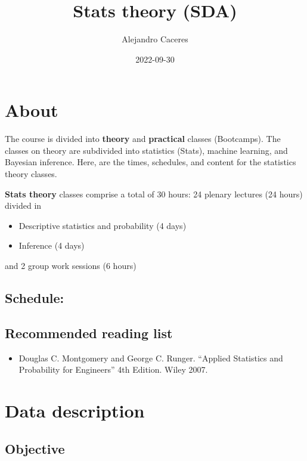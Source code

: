 \documentclass[
]{book}
\title{Stats theory (SDA)}
\author{Alejandro Caceres}
\date{2022-09-30}
\providecommand{\tightlist}{%
  \setlength{\itemsep}{0pt}\setlength{\parskip}{0pt}}
\begin{document}
\maketitle

{
\setcounter{tocdepth}{1}
\tableofcontents
}
\hypertarget{about}{%
\chapter{About}\label{about}}

The course is divided into \textbf{theory} and \textbf{practical} classes (Bootcamps). The classes on theory are subdivided into statistics (Stats), machine learning, and Bayesian inference. Here, are the times, schedules, and content for the statistics theory classes.

\textbf{Stats theory} classes comprise a total of 30 hours: 24 plenary lectures (24 hours) divided in

\begin{itemize}
\tightlist
\item
  Descriptive statistics and probability (4 days)
\item
  Inference (4 days)
\end{itemize}

and 2 group work sessions (6 hours)

\hypertarget{schedule}{%
\section{Schedule:}\label{schedule}}

\hypertarget{recommended-reading-list}{%
\section{Recommended reading list}\label{recommended-reading-list}}

\begin{itemize}
\tightlist
\item
  Douglas C. Montgomery and George C. Runger. ``Applied Statistics and Probability for Engineers'' 4th Edition. Wiley 2007.
\end{itemize}

\hypertarget{data-description}{%
\chapter{Data description}\label{data-description}}

\hypertarget{objective}{%
\section{Objective}\label{objective}}
\end{document}
